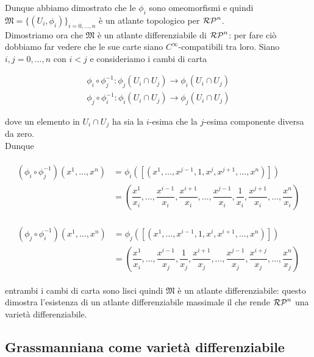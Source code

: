 Dunque abbiamo dimostrato che le $ \phi_{i} $ sono omeomorfismi e quindi $ \mathfrak{M} = \{(U_{i},\phi_{i})\}_{i=0,\dots,n} $ è un atlante topologico per $ \mathcal{RP}^{n} $.\\
Dimostriamo ora che $ \mathfrak{M} $ è un atlante differenziabile di $ \mathcal{RP}^{n} $: per fare ciò dobbiamo far vedere che le sue carte siano $ C^{\infty} $-compatibili tra loro. Siano $ i,j=0,\dots,n $ con $ i<j $ e consideriamo i cambi di carta

\begin{gather}
	\phi_{i} \circ \phi_{j}^{-1} : \phi_{j}(U_{i} \cap U_{j}) \to \phi_{i}(U_{i} \cap U_{j})\\
	\phi_{j} \circ \phi_{i}^{-1} : \phi_{i}(U_{i} \cap U_{j}) \to \phi_{j}(U_{i} \cap U_{j})
\end{gather}

dove un elemento in $ U_{i} \cap U_{j} $ ha sia la $ i $-esima che la $ j $-esima componente diversa da zero.\\
Dunque

\begin{align}
	\begin{split}
		(\phi_{i} \circ \phi_{j}^{-1})(x^{1},\dots,x^{n}) &= \phi_{i}([(x^{1},\dots,x^{j-1},1,x^{j},x^{j+1},\dots,x^{n})])\\
		&= \left( \dfrac{x^{1}}{x_{i}}, \dots, \dfrac{x^{i-1}}{x_{i}}, \dfrac{x^{i+1}}{x_{i}}, \dots, \dfrac{x^{j-1}}{x_{i}}, \dfrac{1}{x_{i}}, \dfrac{x^{j+1}}{x_{i}}, \dots, \dfrac{x^{n}}{x_{i}} \right)
	\end{split}
\end{align}

\begin{align}
	\begin{split}
		(\phi_{j} \circ \phi_{i}^{-1})(x^{1},\dots,x^{n}) &= \phi_{j}([(x^{1},\dots,x^{i-1},1,x^{i},x^{i+1},\dots,x^{n})])\\
		&= \left( \dfrac{x^{1}}{x_{i}}, \dots, \dfrac{x^{i-1}}{x_{j}}, \dfrac{1}{x_{j}}, \dfrac{x^{i+1}}{x_{j}}, \dots, \dfrac{x^{j-1}}{x_{j}}, \dfrac{x^{i+j}}{x_{j}}, \dots, \dfrac{x^{n}}{x_{j}} \right)
	\end{split}
\end{align}

entrambi i cambi di carta sono lisci quindi $ \mathfrak{M} $ è un atlante differenziabile: questo dimostra l'esistenza di un atlante differenziabile massimale il che rende $ \mathcal{RP}^{n} $ una varietà differenziabile.

\subsection{Grassmanniana come varietà differenziabile}

